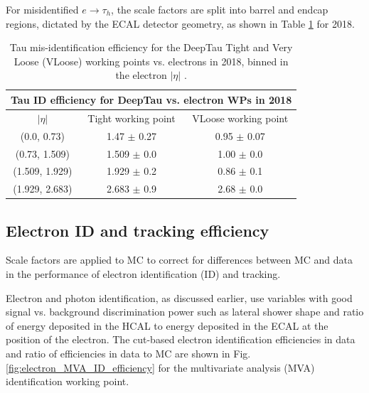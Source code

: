 For misidentified $e \rightarrow \tau_{h}$, the scale factors are split into barrel and endcap regions, dictated by the ECAL detector geometry, as shown in Table \ref{table:tauIDeff_deepTau_vs_electron} for 2018.

\begin{table}[h]
    \centering
    \begin{tabular}{|c|c|c|}
    \hline
    \multicolumn{3}{|c|}{Tau ID efficiency for DeepTau vs. electron WPs in 2018} \\ \hline
    \hline
    $|\eta|$  & Tight working point & VLoose working point \\ \hline
    (0.0, 0.73)     & 1.47 $\pm$ 0.27  & 0.95 $\pm$ 0.07  \\ \hline 
    (0.73, 1.509)   & 1.509 $\pm$ 0.0  & 1.00 $\pm$ 0.0  \\ \hline 
    (1.509, 1.929)  & 1.929 $\pm$ 0.2  & 0.86 $\pm$ 0.1 \\ \hline 
    (1.929, 2.683)  & 2.683 $\pm$ 0.9  & 2.68 $\pm$ 0.0 \\ \hline
    \end{tabular}
    \caption[Tau mis-identification efficiency for the DeepTau Tight and Very Loose (VLoose) working points vs. electrons in 2018.]{Tau mis-identification efficiency for the DeepTau Tight and Very Loose (VLoose) working points vs. electrons in 2018, binned in the electron $|\eta|$ \cite{twiki_TAU_POG_tauidrecommendationforrun2}.}
    \label{table:tauIDeff_deepTau_vs_electron}
\end{table}


\subsection{Electron ID and tracking efficiency}
Scale factors are applied to MC to correct for differences between MC and data in the performance of electron identification (ID) and tracking.

Electron and photon identification, as discussed earlier, use variables with good signal vs. background discrimination power such as lateral shower shape and ratio of energy deposited in the HCAL to energy deposited in the ECAL at the position of the electron. The cut-based electron identification efficiencies in data and ratio of efficiencies in data to MC are shown in Fig. \ref{fig:electron_MVA_ID_efficiency} for the multivariate analysis (MVA) identification working point. 

